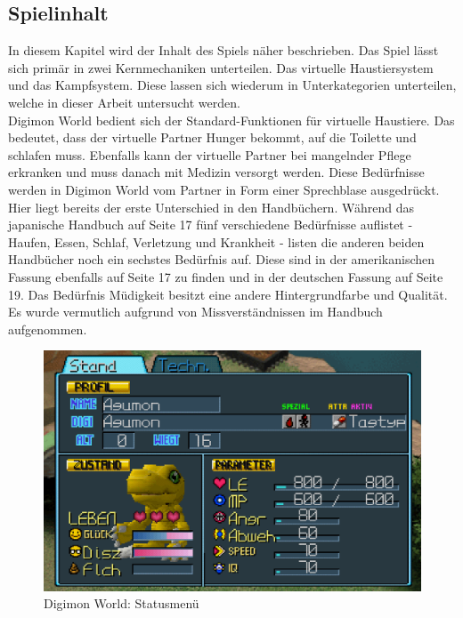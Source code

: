 \subsection{Spielinhalt}\label{sec:game-content}
In diesem Kapitel wird der Inhalt des Spiels näher beschrieben.
Das Spiel lässt sich primär in zwei Kernmechaniken unterteilen.
Das virtuelle Haustiersystem und das Kampfsystem.
Diese lassen sich wiederum in Unterkategorien unterteilen, welche in dieser Arbeit untersucht werden.\\

Digimon World bedient sich der Standard-Funktionen für virtuelle Haustiere.
Das bedeutet, dass der virtuelle Partner Hunger bekommt, auf die Toilette und schlafen muss.
Ebenfalls kann der virtuelle Partner bei mangelnder Pflege erkranken und muss danach mit Medizin versorgt werden.
Diese Bedürfnisse werden in Digimon World vom Partner in Form einer Sprechblase ausgedrückt.
Hier liegt bereits der erste Unterschied in den Handbüchern.
Während das japanische Handbuch auf Seite 17 fünf verschiedene Bedürfnisse auflistet - Haufen, Essen, Schlaf, Verletzung und Krankheit - listen die anderen beiden Handbücher noch ein sechstes Bedürfnis auf.
Diese sind in der amerikanischen Fassung ebenfalls auf Seite 17 zu finden und in der deutschen Fassung auf Seite 19.
Das Bedürfnis Müdigkeit besitzt eine andere Hintergrundfarbe und Qualität.
Es wurde vermutlich aufgrund von Missverständnissen im Handbuch aufgenommen.\\

\begin{figure}[H]
  \begin{center}
    \includegraphics[width=0.8\columnwidth]{figures/screenshots/parameter.png}
    \caption{\label{fig:dw1-parameter} Digimon World: Statusmenü}
  \end{center}
\end{figure}

